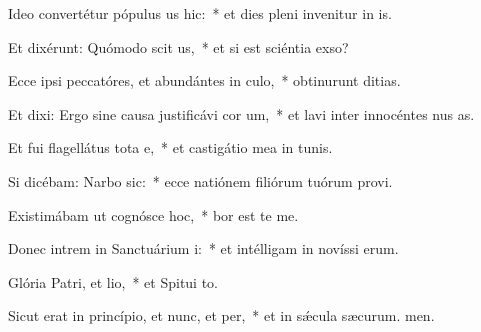 \item Ideo convertétur pópulus us hic:~* et dies pleni invenitur in is.
\item Et dixérunt: Quómodo scit us,~* et si est sciéntia  exso?
\item Ecce ipsi peccatóres, et abundántes in culo,~* obtinurunt ditias.
\item Et dixi: Ergo sine causa justificávi cor um,~* et lavi inter innocéntes nus as.
\item Et fui flagellátus tota e,~* et castigátio mea in tunis.
\item Si dicébam: Narbo sic:~* ecce natiónem filiórum tuórum provi.
\item Existimábam ut cognósce hoc,~* bor est te me.
\item Donec intrem in Sanctuárium i:~* et intélligam in novíssi erum.
\item Glória Patri, et lio,~* et Spitui to.
\item Sicut erat in princípio, et nunc, et per,~* et in sǽcula sæcurum. men.
